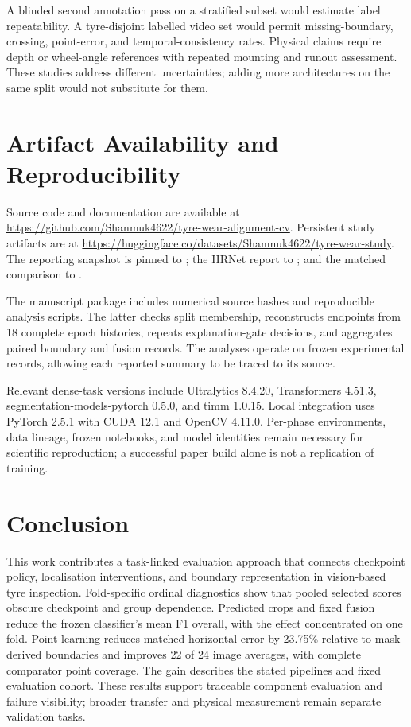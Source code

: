 A blinded second annotation pass on a stratified subset would estimate label repeatability. A tyre-disjoint labelled video set would permit missing-boundary, crossing, point-error, and temporal-consistency rates. Physical claims require depth or wheel-angle references with repeated mounting and runout assessment. These studies address different uncertainties; adding more architectures on the same split would not substitute for them.

\section{Artifact Availability and Reproducibility}
\label{sec:artifacts}
Source code and documentation are available at
\url{https://github.com/Shanmuk4622/tyre-wear-alignment-cv}.
Persistent study artifacts are at
\url{https://huggingface.co/datasets/Shanmuk4622/tyre-wear-study}.
The reporting snapshot is pinned to
; the HRNet report to
; and the matched comparison to
.

The manuscript package includes numerical source hashes and reproducible analysis scripts. The latter checks split membership, reconstructs endpoints from 18 complete epoch histories, repeats explanation-gate decisions, and aggregates paired boundary and fusion records. The analyses operate on frozen experimental records, allowing each reported summary to be traced to its source.

Relevant dense-task versions include Ultralytics 8.4.20, Transformers 4.51.3, segmentation-models-pytorch 0.5.0, and timm 1.0.15. Local integration uses PyTorch 2.5.1 with CUDA 12.1 and OpenCV 4.11.0. Per-phase environments, data lineage, frozen notebooks, and model identities remain necessary for scientific reproduction; a successful paper build alone is not a replication of training.

\section{Conclusion}
This work contributes a task-linked evaluation approach that connects checkpoint policy, localisation interventions, and boundary representation in vision-based tyre inspection. Fold-specific ordinal diagnostics show that pooled selected scores obscure checkpoint and group dependence. Predicted crops and fixed fusion reduce the frozen classifier's mean F1 overall, with the effect concentrated on one fold. Point learning reduces matched horizontal error by 23.75\% relative to mask-derived boundaries and improves 22 of 24 image averages, with complete comparator point coverage. The gain describes the stated pipelines and fixed evaluation cohort. These results support traceable component evaluation and failure visibility; broader transfer and physical measurement remain separate validation tasks.

